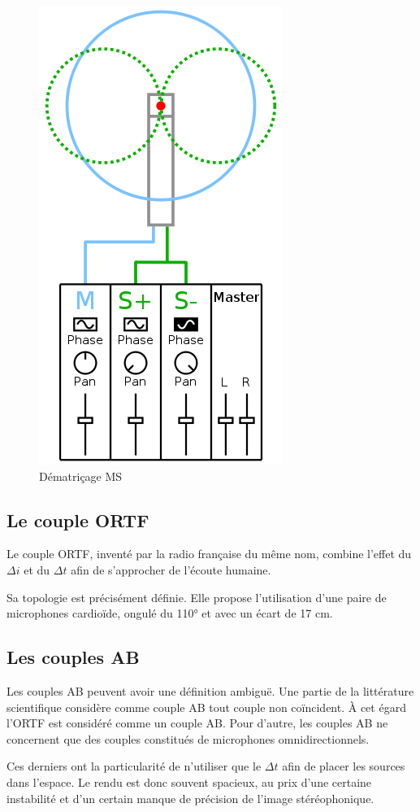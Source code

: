 \documentclass[
]{book}
\begin{document}
\begin{figure}
\includegraphics[width=0.4\linewidth]{_resources/171f157be4749ac8446dd9bdfff0625b} \caption{Dématriçage MS}\label{fig:chunk-label}
\end{figure}

\hypertarget{le-couple-ortf}{%
\subsection{Le couple ORTF}\label{le-couple-ortf}}

Le couple ORTF, inventé par la radio française du même nom, combine l'effet du \(\Delta i\) et du \(\Delta t\) afin de s'approcher de l'écoute humaine.

Sa topologie est précisément définie. Elle propose l'utilisation d'une paire de microphones cardioïde, ongulé du 110° et avec un écart de 17 cm.

\hypertarget{les-couples-ab}{%
\subsection{Les couples AB}\label{les-couples-ab}}

Les couples AB peuvent avoir une définition ambiguë. Une partie de la littérature scientifique considère comme couple AB tout couple non coïncident. À cet égard l'ORTF est considéré comme un couple AB. Pour d'autre, les couples AB ne concernent que des couples constitués de microphones omnidirectionnels.

Ces derniers ont la particularité de n'utiliser que le \(\Delta t\) afin de placer les sources dans l'espace. Le rendu est donc souvent spacieux, au prix d'une certaine instabilité et d'un certain manque de précision de l'image stéréophonique.
\end{document}
